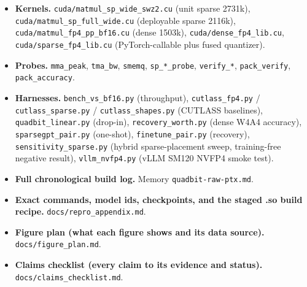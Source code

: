 \documentclass[
]{article}
\providecommand{\tightlist}{%
  \setlength{\itemsep}{0pt}\setlength{\parskip}{0pt}}
\begin{document}
\begin{itemize}
\tightlist
\item
  \textbf{Kernels.} \texttt{cuda/matmul\_sp\_wide\_swz2.cu} (unit sparse
  2731k), \texttt{cuda/matmul\_sp\_full\_wide.cu} (deployable sparse
  2116k), \texttt{cuda/matmul\_fp4\_pp\_bf16.cu} (dense 1503k),
  \texttt{cuda/dense\_fp4\_lib.cu}, \texttt{cuda/sparse\_fp4\_lib.cu}
  (PyTorch-callable plus fused quantizer).
\item
  \textbf{Probes.} \texttt{mma\_peak}, \texttt{tma\_bw}, \texttt{smemq},
  \texttt{sp\_*\_probe}, \texttt{verify\_*}, \texttt{pack\_verify},
  \texttt{pack\_accuracy}.
\item
  \textbf{Harnesses.} \texttt{bench\_vs\_bf16.py} (throughput),
  \texttt{cutlass\_fp4.py} / \texttt{cutlass\_sparse.py} /
  \texttt{cutlass\_shapes.py} (CUTLASS baselines),
  \texttt{quadbit\_linear.py} (drop-in), \texttt{recovery\_worth.py}
  (dense W4A4 accuracy), \texttt{sparsegpt\_pair.py} (one-shot),
  \texttt{finetune\_pair.py} (recovery), \texttt{sensitivity\_sparse.py}
  (hybrid sparse-placement sweep, training-free negative result),
  \texttt{vllm\_nvfp4.py} (vLLM SM120 NVFP4 smoke test).
\item
  \textbf{Full chronological build log.} Memory
  \texttt{quadbit-raw-ptx.md}.
\item
  \textbf{Exact commands, model ids, checkpoints, and the staged .so
  build recipe.} \texttt{docs/repro\_appendix.md}.
\item
  \textbf{Figure plan (what each figure shows and its data source).}
  \texttt{docs/figure\_plan.md}.
\item
  \textbf{Claims checklist (every claim to its evidence and status).}
  \texttt{docs/claims\_checklist.md}.
\end{itemize}
\end{document}
